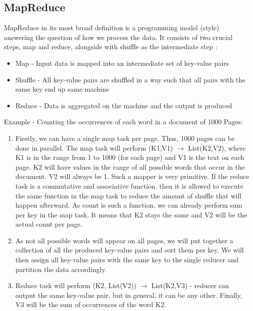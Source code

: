 \subsection{MapReduce}
MapReduce \cite{MapReduce} in its most broad definition is a programming model (style) answering the question of how we process the data. It consists of two crucial steps, map and reduce, alongside with shuffle as the intermediate step \cite{BigDataCourse}: %
\begin{itemize}
	\item Map - Input data is mapped into an intermediate set of key-value pairs
	\item Shuffle - All key-value pairs are shuffled in a way such that all pairs with the same key end up same machine
	\item Reduce - Data is aggregated on the machine and the output is produced
\end{itemize}
Example - Counting the occurrences of each word in a document of 1000 Pages:

\begin{enumerate}
	\item Firstly, we can have a single map task per page. Thus, 1000 pages can be done in parallel. The map task will perform (K1,V1) $\rightarrow$ List(K2,V2), where K1 is in the range from 1 to 1000 (for each page) and V1 is the text on each page. K2 will have values in the range of all possible words that occur in the document. V2 will always be 1. Such a mapper is very primitive. If the reduce task is a commutative and associative function, then it is allowed to execute the same function in the map task to reduce the amount of shuffle that will happen afterward. As count is such a function, we can already perform sum per key in the map task. It means that K2 stays the same and V2 will be the actual count per page.
	\item As not all possible words will appear on all pages, we will put together a collection of all the produced key-value pairs and sort them per key. We will then assign all key-value pairs with the same key to the single reducer and partition the data accordingly.
	\item Reduce task will perform (K2, List(V2)) $\rightarrow$ List(K2,V3) - reducer can output the same key-value pair, but in general, it can be any other. Finally, V3 will be the sum of occurrences of the word K2.
\end{enumerate}
   
